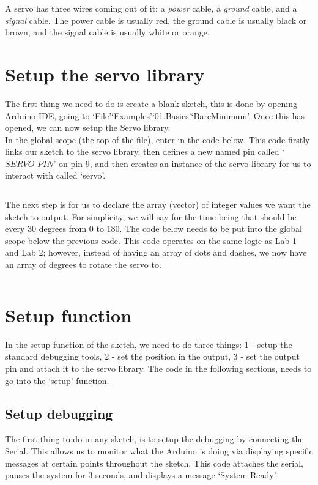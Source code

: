 \documentclass[11pt,a4paper]{article}
\begin{document}
\noindent
A servo has three wires coming out of it: a \textit{power} cable, a \textit{ground} cable, and a \textit{signal} cable. The power cable is usually red, the ground cable is usually black or brown, and the signal cable is usually white or orange.

\section{Setup the servo library}
The first thing we need to do is create a blank sketch, this is done by opening Arduino IDE, going to `File'\textrightarrow `Examples'\textrightarrow `01.Basics'\textrightarrow `BareMinimum'. Once this has opened, we can now setup the Servo library.\\

\noindent
In the global scope (the top of the file), enter in the code below. This code firstly links our sketch to the servo library, then defines a new named pin called `$SERVO\_PIN$' on pin 9, and then creates an instance of the servo library for us to interact with called `servo'.\\
\vspace{-1.75em}
\inputminted{arduino}{./src/1-servo-library.txt}
\vspace{.75em}

\noindent
The next step is for us to declare the array (vector) of integer values we want the sketch to output. For simplicity, we will say for the time being that should be every 30 degrees from 0 to 180. The code below needs to be put into the global scope below the previous code. This code operates on the same logic as Lab 1 and Lab 2; however, instead of having an array of dots and dashes, we now have an array of degrees to rotate the servo to.\\
\vspace{-1.75em}
\inputminted{arduino}{./src/2-degree-list.txt}
\vspace{-.5em}

\section{Setup function}
In the setup function of the sketch, we need to do three things: 1 - setup the standard debugging tools, 2 - set the position in the output, 3 - set the output pin and attach it to the servo library. The code in the following sections, needs to go into the `setup' function.\\

\subsection{Setup debugging}
The first thing to do in any sketch, is to setup the debugging by connecting the Serial. This allows us to monitor what the Arduino is doing via displaying specific messages at certain points throughout the sketch. This code attaches the serial, pauses the system for 3 seconds, and displays a message `System Ready'.\\
\vspace{-1.75em}
\inputminted{arduino}{./src/3-setup-debug.txt}
\vspace{-.5em}
\end{document}
